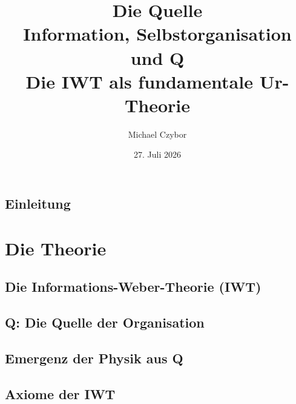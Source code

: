 \documentclass[11pt,a4paper]{book}
\title{
    {\Huge \textbf{Die Quelle}}\\
    {\Large Information, Selbstorganisation und Q}\\
    \vspace{0.5cm}
    {\large Die IWT als fundamentale Ur-Theorie}
}
\author{Michael Czybor}
\date{27. Juli 2026}
\begin{document}
\maketitle
\tableofcontents


\chapter{Einleitung}
\label{ch:einleitung}




\part{Die Theorie}

\chapter{Die Informations-Weber-Theorie (IWT)}
\label{ch:iwt}



\chapter{Q: Die Quelle der Organisation}
\label{ch:q}



\chapter{Emergenz der Physik aus Q}
\label{ch:emergenz}



\chapter{Axiome der IWT}
\label{ch:axiome}



\end{document}
